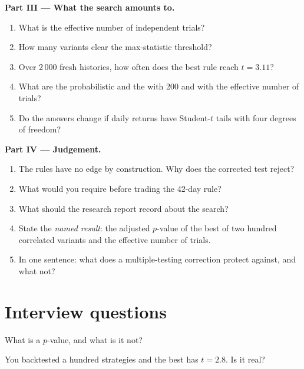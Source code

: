 \begin{problem}
\medskip\noindent\textbf{Part III --- What the search amounts to.}
\begin{enumerate}[resume]
\item What is the effective number of independent trials?
\item How many variants clear the max-statistic threshold?
\item Over 2\,000 fresh histories, how often does the best rule reach $t = 3.11$?
\item What are the probabilistic  and the  with 200 and with the effective number of trials?
\item Do the answers change if daily returns have Student-$t$ tails with four degrees of freedom?
\end{enumerate}

\medskip\noindent\textbf{Part IV --- Judgement.}
\begin{enumerate}[resume]
\item The rules have no edge by construction. Why does the corrected test reject?
\item What would you require before trading the 42-day rule?
\item What should the research report record about the search?
\item State the \emph{named result}: the adjusted $p$-value of the best of two hundred correlated variants and the effective
number of trials.
\item In one sentence: what does a multiple-testing correction protect against, and what not?
\end{enumerate}
\end{problem}

\section{Interview questions}

\begin{interviewq}\label{iq:qm:testing-and-multiple-testing:1}
What is a $p$-value, and what is it not?
\end{interviewq}

\begin{interviewq}\label{iq:qm:testing-and-multiple-testing:2}
You backtested a hundred strategies and the best has $t = 2.8$. Is it real?
\end{interviewq}

